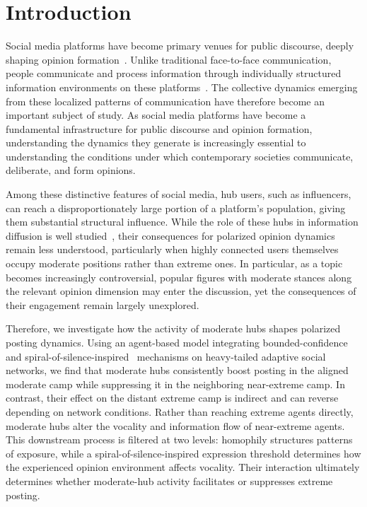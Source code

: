 \documentclass{svproc}
\def\Blue{\color[rgb]{0,0,1}}
\def\Black{\color[rgb]{0,0,0}}
\begin{document}
\begin{abstract}
\Black
{} 
\end{abstract}

\Blue


\section{Introduction}\label{sec:intro}
Social media platforms have become primary venues for public
discourse, deeply shaping opinion formation~\cite{X}. Unlike traditional
face-to-face communication, people communicate and process information
through individually structured information environments on these
platforms~\cite{X}. The collective dynamics emerging from these localized
patterns of communication have therefore become an important subject
of study. As social media platforms have become a fundamental
infrastructure for public discourse and opinion formation,
understanding the dynamics they generate is increasingly essential to
understanding the conditions under which contemporary societies
communicate, deliberate, and form opinions.
\par

Among these distinctive features of social media, hub users, such as
influencers, can reach a disproportionately large portion of a
platform's population, giving them substantial structural
influence. While the role of these hubs in information diffusion is
well studied~\cite{X}, their consequences for polarized opinion dynamics remain
less understood, particularly when highly connected users themselves
occupy moderate positions rather than extreme ones. In particular, as
a topic becomes increasingly controversial, popular figures with
moderate stances along the relevant opinion dimension may enter the
discussion, yet the consequences of their engagement remain largely
unexplored.
\par


Therefore, we investigate how the activity of moderate hubs shapes
polarized posting dynamics. Using an agent-based model integrating
bounded-confidence~\cite{deffuant2000,hegselmann2002} and
spiral-of-silence-inspired~\cite{noelle-neumann1974} mechanisms on 
heavy-tailed adaptive social networks, we find that moderate hubs
consistently boost posting in the aligned moderate camp while
suppressing it in the neighboring near-extreme camp. In contrast,
their effect on the distant extreme camp is indirect and can reverse
depending on network conditions. Rather than reaching extreme agents
directly, moderate hubs alter the vocality and information flow of
near-extreme agents. This downstream process is filtered at two
levels: homophily structures patterns of exposure, while a
spiral-of-silence-inspired expression threshold determines how the
experienced opinion environment affects vocality. Their interaction
ultimately determines whether moderate-hub activity facilitates or
suppresses extreme posting.
\par
\end{document}
